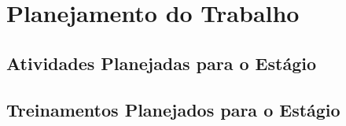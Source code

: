 \chapter{Planejamento do Trabalho}
\label{ch:planejamento-do-trabalho}

\section{Atividades Planejadas para o Estágio}



\section{Treinamentos Planejados para o Estágio}


